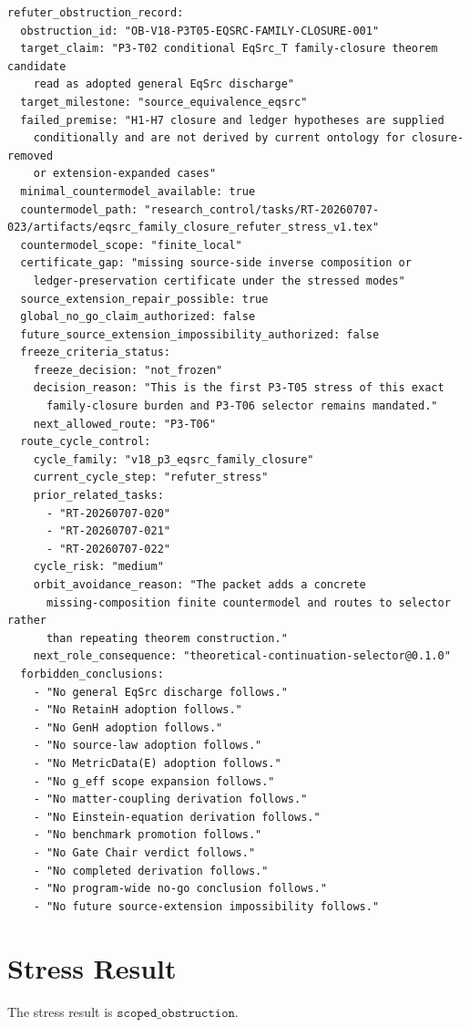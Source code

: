 \documentclass[11pt]{article}
\begin{document}
\begin{verbatim}
refuter_obstruction_record:
  obstruction_id: "OB-V18-P3T05-EQSRC-FAMILY-CLOSURE-001"
  target_claim: "P3-T02 conditional EqSrc_T family-closure theorem candidate
    read as adopted general EqSrc discharge"
  target_milestone: "source_equivalence_eqsrc"
  failed_premise: "H1-H7 closure and ledger hypotheses are supplied
    conditionally and are not derived by current ontology for closure-removed
    or extension-expanded cases"
  minimal_countermodel_available: true
  countermodel_path: "research_control/tasks/RT-20260707-023/artifacts/eqsrc_family_closure_refuter_stress_v1.tex"
  countermodel_scope: "finite_local"
  certificate_gap: "missing source-side inverse composition or
    ledger-preservation certificate under the stressed modes"
  source_extension_repair_possible: true
  global_no_go_claim_authorized: false
  future_source_extension_impossibility_authorized: false
  freeze_criteria_status:
    freeze_decision: "not_frozen"
    decision_reason: "This is the first P3-T05 stress of this exact
      family-closure burden and P3-T06 selector remains mandated."
    next_allowed_route: "P3-T06"
  route_cycle_control:
    cycle_family: "v18_p3_eqsrc_family_closure"
    current_cycle_step: "refuter_stress"
    prior_related_tasks:
      - "RT-20260707-020"
      - "RT-20260707-021"
      - "RT-20260707-022"
    cycle_risk: "medium"
    orbit_avoidance_reason: "The packet adds a concrete
      missing-composition finite countermodel and routes to selector rather
      than repeating theorem construction."
    next_role_consequence: "theoretical-continuation-selector@0.1.0"
  forbidden_conclusions:
    - "No general EqSrc discharge follows."
    - "No RetainH adoption follows."
    - "No GenH adoption follows."
    - "No source-law adoption follows."
    - "No MetricData(E) adoption follows."
    - "No g_eff scope expansion follows."
    - "No matter-coupling derivation follows."
    - "No Einstein-equation derivation follows."
    - "No benchmark promotion follows."
    - "No Gate Chair verdict follows."
    - "No completed derivation follows."
    - "No program-wide no-go conclusion follows."
    - "No future source-extension impossibility follows."
\end{verbatim}

\section{Stress Result}

The stress result is \(\texttt{scoped\_obstruction}\).
\end{document}
